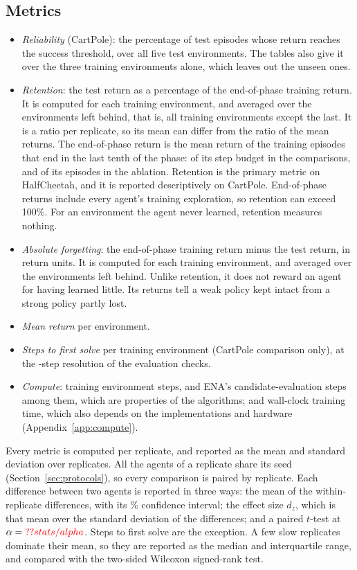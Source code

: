 \subsection{Metrics}
\label{sec:metrics}
\begin{itemize}
\item \textit{Reliability} (CartPole): the percentage of test episodes whose return reaches the success threshold, over all five test environments. The tables also give it over the three training environments alone, which leaves out the unseen ones.
\item \textit{Retention}: the test return as a percentage of the end-of-phase training return. It is computed for each training environment, and averaged over the environments left behind, that is, all training environments except the last. It is a ratio per replicate, so its mean can differ from the ratio of the mean returns. The end-of-phase return is the mean return of the training episodes that end in the last tenth of the phase: of its step budget in the comparisons, and of its episodes in the ablation. Retention is the primary metric on HalfCheetah, and it is reported descriptively on CartPole. End-of-phase returns include every agent's training exploration, so retention can exceed 100\%. For an environment the agent never learned, retention measures nothing.
\item \textit{Absolute forgetting}: the end-of-phase training return minus the test return, in return units. It is computed for each training environment, and averaged over the environments left behind. Unlike retention, it does not reward an agent for having learned little. Its returns tell a weak policy kept intact from a strong policy partly lost.
\item \textit{Mean return} per environment.
\item \textit{Steps to first solve} per training environment (CartPole comparison only), at the -step resolution of the evaluation checks.
\item \textit{Compute}: training environment steps, and ENA's candidate-evaluation steps among them, which are properties of the algorithms; and wall-clock training time, which also depends on the implementations and hardware (Appendix~\ref{app:compute}).
\end{itemize}
Every metric is computed per replicate, and reported as the mean and standard deviation over replicates. All the agents of a replicate share its seed (Section~\ref{sec:protocols}), so every comparison is paired by replicate. Each difference between two agents is reported in three ways: the mean of the within-replicate differences, with its \% confidence interval; the effect size $d_z$, which is that mean over the standard deviation of the differences; and a paired $t$-test at $\alpha = \Res{stats/alpha}$. Steps to first solve are the exception. A few slow replicates dominate their mean, so they are reported as the median and interquartile range, and compared with the two-sided Wilcoxon signed-rank test.

